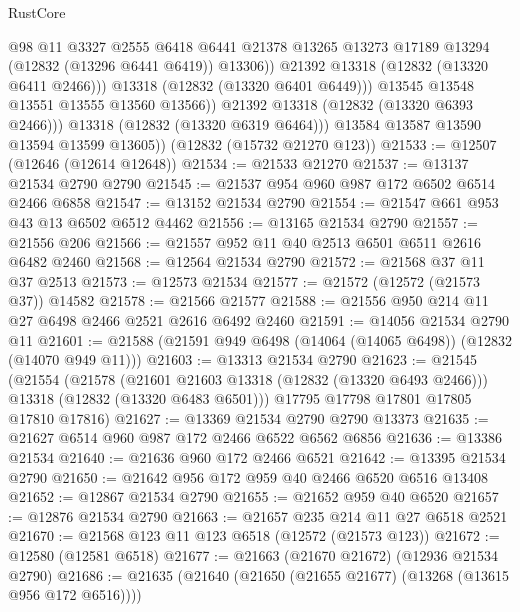 \begin{lexlean}{RustCore}
\begin{coremodule}
                        @98
                        @11
                        @3327
                        @2555
                        @6418
                        @6441
                        @21378
                        @13265
                        @13273
                        @17189
                        @13294
                        (@12832 (@13296 @6441 @6419))
                        @13306))
                    @21392
                    @13318
                    (@12832 (@13320 @6411 @2466)))
                  @13318
                  (@12832 (@13320 @6401 @6449)))
                @13545
                @13548
                @13551
                @13555
                @13560
                @13566))
            @21392
            @13318
            (@12832 (@13320 @6393 @2466)))
          @13318
          (@12832 (@13320 @6319 @6464)))
        @13584
        @13587
        @13590
        @13594
        @13599
        @13605))
    (@12832 (@15732 @21270 @123))
@21533 := @12507 (@12646 (@12614 @12648))
@21534 := @21533 @21270
@21537 := @13137 @21534 @2790 @2790
@21545 := @21537 @954 @960 @987 @172 @6502 @6514 @2466 @6858
@21547 := @13152 @21534 @2790
@21554 := @21547 @661 @953 @43 @13 @6502 @6512 @4462
@21556 := @13165 @21534 @2790
@21557 := @21556 @206
@21566 := @21557 @952 @11 @40 @2513 @6501 @6511 @2616 @6482 @2460
@21568 := @12564 @21534 @2790
@21572 := @21568 @37 @11 @37 @2513
@21573 := @12573 @21534
@21577 := @21572 (@12572 (@21573 @37)) @14582
@21578 := @21566 @21577
@21588 := @21556 @950 @214 @11 @27 @6498 @2466 @2521 @2616 @6492 @2460
@21591 := @14056 @21534 @2790 @11
@21601 := @21588 (@21591 @949 @6498 (@14064 (@14065 @6498)) (@12832 (@14070 @949 @11)))
@21603 := @13313 @21534 @2790
@21623 := @21545
    (@21554
      (@21578
        (@21601 @21603 @13318 (@12832 (@13320 @6493 @2466)))
        @13318
        (@12832 (@13320 @6483 @6501)))
      @17795
      @17798
      @17801
      @17805
      @17810
      @17816)
@21627 := @13369 @21534 @2790 @2790 @13373
@21635 := @21627 @6514 @960 @987 @172 @2466 @6522 @6562 @6856
@21636 := @13386 @21534
@21640 := @21636 @960 @172 @2466 @6521
@21642 := @13395 @21534 @2790
@21650 := @21642 @956 @172 @959 @40 @2466 @6520 @6516 @13408
@21652 := @12867 @21534 @2790
@21655 := @21652 @959 @40 @6520
@21657 := @12876 @21534 @2790
@21663 := @21657 @235 @214 @11 @27 @6518 @2521
@21670 := @21568 @123 @11 @123 @6518 (@12572 (@21573 @123))
@21672 := @12580 (@12581 @6518)
@21677 := @21663 (@21670 @21672) (@12936 @21534 @2790)
@21686 := @21635 (@21640 (@21650 (@21655 @21677) (@13268 (@13615 @956 @172 @6516))))

\end{coremodule}
\end{lexlean}

